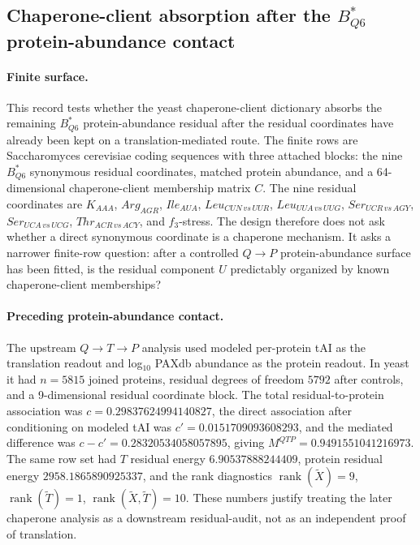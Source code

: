 
\subsection{Chaperone-client absorption after the $B^*_{Q6}$ protein-abundance contact}
\label{sec:bioreality-chaperone-client-bstar-q6-absorption}

\paragraph{Finite surface.}
This record tests whether the yeast chaperone-client dictionary absorbs the remaining $B^*_{Q6}$ protein-abundance residual after the residual coordinates have already been kept on a translation-mediated route.  The finite rows are Saccharomyces cerevisiae coding sequences with three attached blocks: the nine $B^*_{Q6}$ synonymous residual coordinates, matched protein abundance, and a 64-dimensional chaperone-client membership matrix $C$.  The nine residual coordinates are
$K_{AAA}$, $Arg_{AGR}$, $Ile_{AUA}$, $Leu_{CUN\,vs\,UUR}$, $Leu_{UUA\,vs\,UUG}$, $Ser_{UCR\,vs\,AGY}$, $Ser_{UCA\,vs\,UCG}$, $Thr_{ACR\,vs\,ACY}$, and $f_3$-stress.  The design therefore does not ask whether a direct synonymous coordinate is a chaperone mechanism.  It asks a narrower finite-row question: after a controlled $Q \to P$ protein-abundance surface has been fitted, is the residual component $U$ predictably organized by known chaperone-client memberships?

\paragraph{Preceding protein-abundance contact.}
The upstream $Q \to T \to P$ analysis used modeled per-protein tAI as the translation readout and log$_{10}$ PAXdb abundance as the protein readout.  In yeast it had $n=5815$ joined proteins, residual degrees of freedom $5792$ after controls, and a 9-dimensional residual coordinate block.  The total residual-to-protein association was $c=0.29837624994140827$, the direct association after conditioning on modeled tAI was $c'=0.0151709093608293$, and the mediated difference was $c-c'=0.28320534058057895$, giving $M^{QTP}=0.9491551041216973$.  The same row set had $T$ residual energy $6.90537888244409$, protein residual energy $2958.1865890925337$, and the rank diagnostics $\operatorname{rank}(\widetilde X)=9$, $\operatorname{rank}(\widetilde T)=1$, $\operatorname{rank}(\widetilde X,\widetilde T)=10$.  These numbers justify treating the later chaperone analysis as a downstream residual-audit, not as an independent proof of translation.

